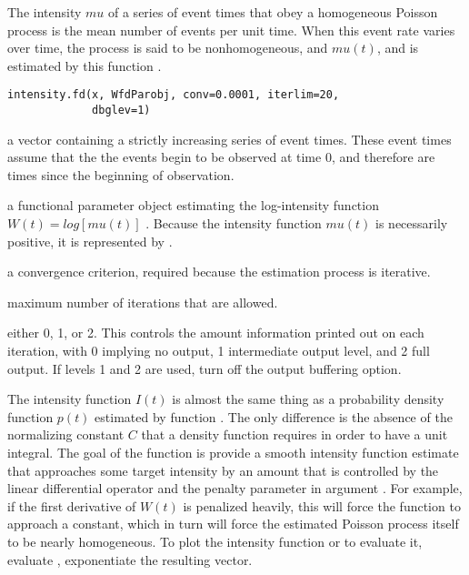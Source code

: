 \begin{Description}\relax
The intensity $mu$ of a series of event times that obey a
homogeneous Poisson process is the mean number of events per unit time.
When this event rate varies over time, the process is said to be
nonhomogeneous, and $mu(t)$, and is estimated by this function
.
\end{Description}
\begin{Usage}
\begin{verbatim}
intensity.fd(x, WfdParobj, conv=0.0001, iterlim=20,
             dbglev=1)
\end{verbatim}
\end{Usage}
\begin{Arguments}
\begin{ldescription}
\item[\code{x}] a vector containing a strictly increasing series of event times.
These event times assume that the the events begin to be observed
at time 0, and therefore are times since the beginning of
observation.

\item[\code{WfdParobj}] a functional parameter object estimating the log-intensity function
$W(t) = log[mu(t)]$ .
Because the intensity function $mu(t)$ is necessarily positive,
it is represented by .

\item[\code{conv}] a convergence criterion, required because the estimation
process is iterative.

\item[\code{iterlim}] maximum number of iterations that are allowed.

\item[\code{dbglev}] either 0, 1, or 2.  This controls the amount information printed out on
each iteration, with 0 implying no output, 1 intermediate output level,
and 2 full output.  If levels 1 and 2 are used, turn off the output
buffering option.

\end{ldescription}
\end{Arguments}
\begin{Details}\relax
The intensity function $I(t)$ is almost the same thing as a
probability density function $p(t)$ estimated by function
.  The only difference is the absence of
the normalizing constant $C$ that a density function requires
in order to have a unit integral.
The goal of the function is provide a smooth intensity function
estimate that approaches some target intensity by an amount that is
controlled by the linear differential operator  and
the penalty parameter in argument .
For example, if the first derivative of
$W(t)$ is penalized heavily, this will force the function to
approach a constant, which in turn will force the estimated Poisson
process itself to be nearly homogeneous.
To plot the intensity function or to evaluate it,
evaluate , exponentiate the resulting vector.
\end{Details}
